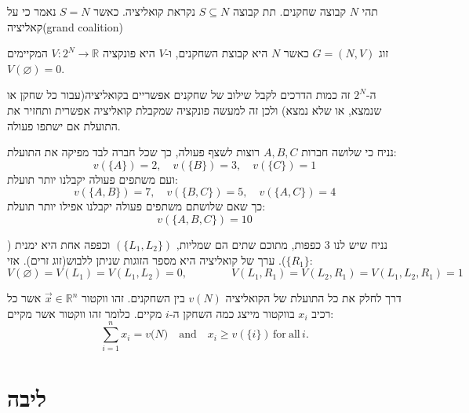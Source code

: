 \documentclass{tstextbook}
\begin{document}
\begin{definition}[קואליציה]
תהי \(N\) קבוצה שחקנים. תת קבוצה \(S\subseteq N\) נקראת קואליציה. כאשר \(S=N\) נאמר כי על קאליציה(grand coalition)

\end{definition}
\begin{definition}
זוג \(G=(N,V)\) כאשר \(N\) היא קבוצת השחקנים, ו-\(V\) היא פונקציה \(V:2^{N}\to \mathbb{R}\) המקיימים \(V\left( \varnothing \right)=0\).

\end{definition}
\begin{remark}
ה-\(2^{N}\) זה כמות הדרכים לקבל שילוב של שחקנים אפשריים בקואליציה(עבור כל שחקן או שנמצא, או שלא נמצא) ולכן זה למעשה פונקציה שמקבלת קואליציה אפשרית ותחזיר את התועלת אם ישתפו פעולה.

\end{remark}
\begin{example}
נניח כי שלושה חברות \(A,B,C\) רוצות לשצף פעולה, כך שכל חברה לבד מפיקה את התועלת:
$$v\left( \{A\} \right)=2,\quad v\left( \{B\} \right)=3,\quad v\left( \{C\} \right)=1$$
ועם משתפים פעולה יקבלנו יותר תועלת:
$$v\left( \{A,B\} \right)=7,\quad v\left( \{B,C\} \right)=5,\quad v\left( \{A,C\} \right)=4$$
כך שאם שלושתם משתפים פעולה יקבלנו אפילו יותר תועלת:
$$v\left( \{ A,B,C \} \right)=10$$

\end{example}
\begin{example}
נניח שיש לנו 3 כפפות, מתוכם שתים הם שמליות, \(\left( \{ L_{1},L_{2} \} \right)\) וכפפה אחת היא ימנית (\(\{ R_{1} \}\)). ערך של קואליציה היא מספר הזוגות שניתן ללבוש(זוג זרים). אזי:
$$V\left(\varnothing\right)=V\left(L_{1}\right)=V\left(L_{1},L_{2}\right)=0,\qquad\qquad V\left(L_{1},R_{1}\right)=V\left(L_{2},R_{1}\right)=V\left(L_{1},L_{2},R_{1}\right)=1$$

\end{example}
\begin{definition}
דרך לחלק את כל התועלת של הקואליציה \(v(N)\) בין השחקנים. זהו ווקטור \(\vec{x} \in \mathbb{R}^{n}\) אשר כל רכיב \(x_{i}\) בווקטור מייצג כמה השחקן ה-\(i\) מקיים. כלומר זהו ווקטור אשר מקיים:
$$\sum_{i=1}^{n}x_{i}=v{\big(}N{\big)}\quad{\mathrm{and}}\quad x_{i}\geq v(\{i\})\,{\mathrm{for~all}}\,i.$$

\end{definition}
\section{ליבה}
\end{document}
